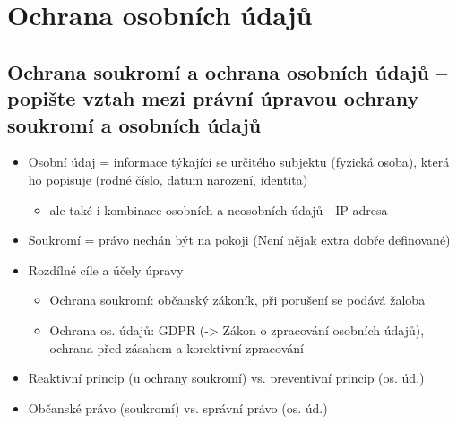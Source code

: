 \section{Ochrana osobních údajů}

\subsection{Ochrana soukromí a ochrana osobních údajů -- popište vztah mezi právní úpravou ochrany soukromí a osobních údajů}
\begin{itemize}
    \item Osobní údaj = informace týkající se určitého subjektu (fyzická osoba), která ho popisuje (rodné číslo, datum narození, identita)
    \begin{itemize}
        \item ale také i kombinace osobních a neosobních údajů - IP adresa
    \end{itemize}
    \item Soukromí = právo nechán být na pokoji (Není nějak extra dobře definované)
    \item Rozdílné cíle a účely úpravy
    \begin{itemize}
        \item Ochrana soukromí: občanský zákoník, při porušení se podává žaloba
        \item Ochrana os. údajů: GDPR (-> Zákon o zpracování osobních údajů), ochrana před zásahem a korektivní zpracování
    \end{itemize}
    \item Reaktivní princip (u ochrany soukromí) vs. preventivní princip (os. úd.)
    \item Občanské právo (soukromí) vs. správní právo (os. úd.)
\end{itemize}



